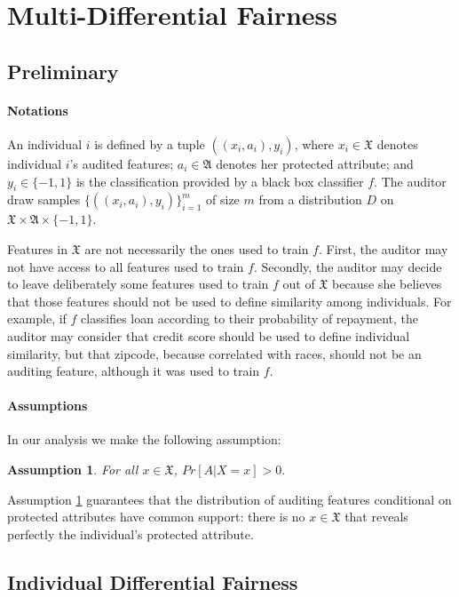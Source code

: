 \documentclass{article}
\newtheorem{assumption}{Assumption}
\begin{document}
\section{Multi-Differential Fairness}

\subsection{Preliminary}

\paragraph{Notations}
An individual $i$ is defined by a tuple $((x_{i}, a_{i}), y_{i})$, where $x_{i}\in \mathfrak{X}$ denotes individual $i$'s audited features; $a_{i}\in\mathfrak{A}$ denotes her protected attribute; and $y_{i}\in \{-1, 1\}$ is the classification provided by a black box classifier $f$. The auditor draw samples $
\{((x_{i}, a_{i}), y_{i})\}_{i=1}^{m}$ of size $m$ from a distribution $D$ on $\mathfrak{X} \times \mathfrak{A}\times \{-1, 1\}$. 

\bigskip
Features in $\mathfrak{X}$ are not necessarily the ones used to train $f$. First, the auditor may not have access to all features used to train $f$. Secondly, the auditor may decide to leave deliberately some features used to train $f$ out of $\mathfrak{X}$ because she believes that those features should not be used to define similarity among individuals. For example, if $f$ classifies loan according to their probability of repayment, the auditor may consider that credit score should be used to define individual similarity, but that zipcode, because correlated with races, should not be an auditing feature, although it was used to train $f$.  

\paragraph{Assumptions}
In our analysis we make the following assumption:
\begin{assumption}
\label{ass: 1}
For all $x\in \mathfrak{X}$, $Pr[A|X=x] > 0.$
\end{assumption}
Assumption \ref{ass: 1} guarantees that the distribution of auditing features conditional on protected attributes have common support: there is no $x\in \mathfrak{X}$ that reveals perfectly the individual's protected attribute.  

\subsection{Individual Differential Fairness}
\end{document}
